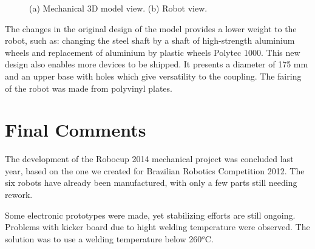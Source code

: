 \documentclass{llncs}
\begin{document}
\begin{figure}[thpb]
	\centering
	\caption{(a) Mechanical 3D model view. (b) Robot view.}
	\label{mec}
\end{figure}

The changes in the original design of the model provides a lower weight to
the robot, such as: changing the steel shaft by a shaft of high-strength
aluminium wheels and replacement of aluminium by plastic wheels Polytec
1000. This new design also enables more devices to be shipped. It presents
a diameter of 175 mm and an upper base with holes which give versatility
to the coupling. The fairing of the robot was made from polyvinyl plates.

\section{Final Comments}
The development of the Robocup 2014 mechanical project was concluded last year,
based on the one we created for Brazilian Robotics Competition 2012. The six
robots have already been manufactured, with only a few parts still needing rework.

Some electronic prototypes were made, yet stabilizing efforts are still ongoing.
Problems with kicker board due to hight welding temperature were observed. The solution
was to use a welding temperature below 260$^o$C.
\end{document}

